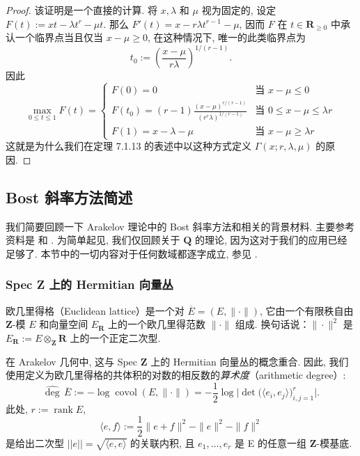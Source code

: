 \begin{proof}
该证明是一个直接的计算. 
将 \(x, \lambda\) 和 \(\mu\) 视为固定的, 设定 \(F(t) := xt - \lambda t^r - \mu t\). 
那么 \(F'(t) = x - r\lambda t^{r-1} - \mu\), 
因而 \(F\) 在 \(t \in \mathbf{R}_{\geq 0}\) 中承认一个临界点当且仅当 \(x - \mu \geq 0\), 
在这种情况下, 唯一的此类临界点为
\[ t_0 := \left(\frac{x - \mu}{r\lambda}\right)^{1/(r-1)}. \]
因此
\[ \max_{0 \le t \le 1} F(t) = \begin{cases} F(0) = 0 & \text{当 } x - \mu \le 0 \\ F(t_0) = (r - 1) \frac{(x - \mu)^{r/(r - 1)}}{(r^r \lambda)^{1/(r - 1)}} & \text{当 } 0 \le x - \mu \le \lambda r \\ F(1) = x - \lambda - \mu & \text{当 } x - \mu \ge \lambda r \end{cases} \]
这就是为什么我们在定理 7.1.13 的表述中以这种方式定义 \(\Gamma(x; r, \lambda, \mu)\) 的原因.
\end{proof}

\subsection{Bost 斜率方法简述}\label{sec:7.2}

我们简要回顾一下 Arakelov 理论中的 Bost 斜率方法和相关的背景材料. 
主要参考资料是 \cite[第 4.1、4.2 节]{Bos01} 和 \cite[第 1 章]{Bos20}. 
为简单起见, 我们仅回顾关于 \(\mathbf{Q}\) 的理论, 因为这对于我们的应用已经足够了. 
本节中的一切内容对于任何数域都逐字成立, 参见 \cite{CDT24}.

\subsubsection{Spec Z 上的 Hermitian 向量丛}\label{sec:7.2.1}

\begin{definition}\label{def:7.2.2}
欧几里得格（Euclidean lattice）是一个对 \(\overline{E} = (E, \|\cdot\|)\), 
它由一个有限秩自由 \(\mathbf{Z}\)-模 \(E\) 和向量空间 \(E_{\mathbf{R}}\) 上的一个欧几里得范数 \(\|\cdot\|\) 组成. 
换句话说：\(\|\cdot\|^2\) 是 \(E_{\mathbf{R}} := E \otimes_{\mathbf{Z}} \mathbf{R}\) 上的一个正定二次型.
\end{definition}

在 Arakelov 几何中, 这与 Spec \(\mathbf{Z}\) 上的 Hermitian 向量丛的概念重合. 
因此, 我们使用定义为欧几里得格的共体积的对数的相反数的\emph{算术度}（arithmetic degree）:
\begin{equation}\label{eq:7.2.3}
\widehat{\operatorname{deg}}\,\overline{E} := -\log\operatorname{covol}(E, \|\cdot\|) = -\frac{1}{2}\log\big|\operatorname{det}\big(\langle e_i, e_j\rangle\big)_{i,j=1}^r\big|.
\end{equation}
此处, \(r := \operatorname{rank} E\),
\[ \langle e, f \rangle := \frac{1}{2} \|e + f\|^2 - \|e\|^2 - \|f\|^2 \]
是给出二次型 \(||e|| = \sqrt{\langle e, e \rangle}\) 的关联内积, 
且 \(e_1, \ldots, e_r\) 是 E 的任意一组 \(\mathbf{Z}\)-模基底.


